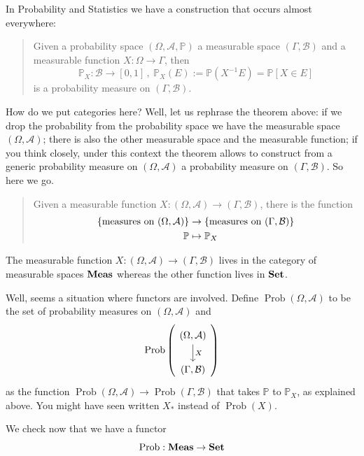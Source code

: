 \begin{example}
  In Probability and Statistics we have a construction that occurs
  almost everywhere:
  \begin{quotation}
    Given a probability space \((\Omega, \mathcal{A},\mathbb{P})\) a measurable space
    \((\Gamma, \mathcal{B})\) and a measurable function \(X : \Omega \to \Gamma\), then
    \[
      \mathbb{P}_X : \mathcal{B} \to [0,1] \,,\ \mathbb{P}_X(E) := \mathbb{P}\left(X^{-1}E\right) = \mathbb{P}[X \in E]
    \]
    is a probability measure on \((\Gamma, \mathcal{B})\).
  \end{quotation}
  How do we put categories here? Well, let us rephrase the theorem
  above: if we drop the probability from the probability space we have
  the measurable space \((\Omega, \mathcal{A})\); there is also the other measurable
  space and the measurable function; if you think closely, under this
  context the theorem allows to construct from a generic probability
  measure on \((\Omega, \mathcal{A})\) a probability measure on
  \((\Gamma, \mathcal{B})\). So here we go.
  \begin{quotation}
    Given a measurable function
    \(X : (\Omega, \mathcal{A}) \to (\Gamma, \mathcal{B})\), there is the function
    \begin{align*}
      \left\{\text{measures on } (\Omega, \mathcal{A})\right\} & \to \left\{\text{measures on }
                                         (\Gamma, \mathcal{B})\right\} \\
      \mathbb{P} & \mapsto \mathbb{P}_X
    \end{align*}
  \end{quotation}
  The measurable function
  \(X : (\Omega, \mathcal{A}) \to (\Gamma, \mathcal{B})\) lives in the category of measurable spaces
  \(\mathbf{Meas}\) whereas the other function lives in \(\mathbf{Set}\).

  Well, seems a situation where functors are involved. Define
  \(\operatorname{Prob}(\Omega, \mathcal{A})\) to be the set of probability measures on
  \((\Omega, \mathcal{A})\) and
  \[
    \operatorname{Prob} \left(
      \begin{tikzcd}
        (\Omega, \mathcal{A}) \ar["X", d] \\ (\Gamma, \mathcal{B})
      \end{tikzcd}
    \right)
  \]
  as the function
  \(\operatorname{Prob}(\Omega, \mathcal{A}) \to \operatorname{Prob}(\Gamma, \mathcal{B})\) that takes
  \(\mathbb{P}\) to \(\mathbb{P}_X\), as explained above. You might have seen written
  \(X_\ast\) instead of \(\operatorname{Prob}(X)\).

  We check now that we have a functor
  \[
    \operatorname{Prob} : \mathbf{Meas} \to \mathbf{Set}
  \]
\end{example}

